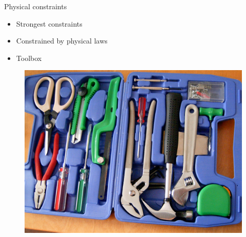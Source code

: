 \documentclass{beamer}
\begin{document}
\begin{frame}{Physical constraints}
    		 \begin{itemize}
    		 \item Strongest constraints
    		 \item Constrained by physical laws
    		 \item Toolbox
    		 \end{itemize}
             \begin{figure}
             \includegraphics[scale=0.1]{toolbox.jpg}
             \end{figure}

\end{frame}
\end{document}
